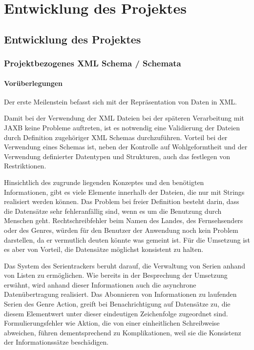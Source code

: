 
\chapter{Entwicklung des Projektes}

\section{Entwicklung des Projektes}

\subsection{Projektbezogenes XML Schema / Schemata}
\subsubsection{Vorüberlegungen}
Der erste Meilenstein befasst sich mit der Repräsentation von Daten in XML.

Damit bei der Verwendung der XML Dateien bei der späteren Verarbeitung mit JAXB keine Probleme auftreten,
ist es notwendig eine Validierung der Dateien durch Definition zugehöriger XML Schemas durchzuführen.
Vorteil bei der Verwendung eines Schemas ist, neben der Kontrolle auf Wohlgeformtheit und der Verwendung
definierter Datentypen und Strukturen, auch das festlegen von Restriktionen.

Hinsichtlich des zugrunde liegenden Konzeptes und den benötigten Informationen, gibt es viele Elemente
innerhalb der Dateien, die nur mit Strings realisiert werden können. Das Problem bei freier Definition
besteht darin, dass die Datensätze sehr fehleranfällig sind, wenn es um die Benutzung durch Menschen geht.
Rechtschreibfehler beim Namen des Landes, des Fernsehsenders oder des Genres, würden für den Benutzer der
Anwendung noch kein Problem darstellen, da er vermutlich deuten könnte was gemeint ist.
Für die Umsetzung ist es aber von Vorteil, die Datensätze möglichst konsistent zu halten.

Das System des Serientrackers beruht darauf, die Verwaltung von Serien anhand von Listen zu ermöglichen. Wie bereits in der Besprechung der Umsetzung erwähnt, wird anhand dieser Informationen auch die asynchrone Datenübertragung realisiert.
Das Abonnieren von Informationen zu laufenden Serien des Genre Action, greift bei Benachrichtigung auf
Datensätze zu, die diesem Elementwert unter dieser eindeutigen Zeichenfolge zugeordnet sind. Formulierungsfehler
wie Aktion, die von einer einheitlichen Schreibweise abweichen, führen dementsprechend zu Komplikationen, weil sie die Konsistenz der Informationssätze beschädigen. \\\\

